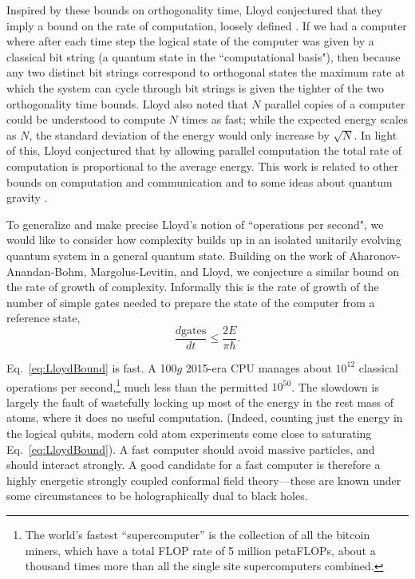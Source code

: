 \documentclass[12pt]{article}
\numberwithin{equation}{section}
\renewcommand{\eqref}[1]{Eq.~\ref{#1}}
\begin{document}
Inspired by these bounds on orthogonality time, Lloyd conjectured that they imply a bound on the rate of computation, loosely defined \cite{lloyd2000ultimate}. If we had a computer where after each time step the logical state of the computer was given by a classical bit string (a quantum state in the ``computational basis"), then because any two distinct bit strings correspond to orthogonal states the maximum rate at which the system can cycle through bit strings is given the tighter of the two orthogonality time bounds. Lloyd also noted that $N$ parallel copies of a computer could be understood to compute $N$ times as fast; while the expected energy scales as $N$, the standard deviation of the energy would only increase by $\sqrt{N}$. In light of this, Lloyd conjectured \cite{lloyd2000ultimate} that by allowing parallel computation the total rate of computation is proportional to the average energy. This work is related to other bounds on computation and communication \cite{otherbounds1,otherbounds2,otherbounds3} and to some ideas about quantum gravity \cite{lloyd_qg1,lloyd_qg2,lloyd_qg3}.

To generalize and make precise Lloyd's notion of ``operations per second", we would like to consider how complexity builds up in an isolated unitarily evolving quantum system in a general quantum state. Building on the work of Aharonov-Anandan-Bohm, Margolus-Levitin, and Lloyd, we conjecture a similar bound on the rate of growth of complexity. Informally this is the rate of growth of the number of simple gates needed to prepare the state of the computer from a reference state,
\begin{equation}
\frac{d \textrm{gates}}{dt} \leq \frac{2E}{\pi \hbar}. \label{eq:LloydBound}
\end{equation}


\eqref{eq:LloydBound} is fast. A 100$g$ 2015-era CPU manages about $10^{12}$ classical operations per second,\footnote{The world's fastest ``supercomputer'' is the collection of all the bitcoin miners, which have a total FLOP rate of 5 million petaFLOPs, about a thousand times more than all the single site supercomputers combined.} much less than the permitted $10^{50}$. The slowdown is largely the fault of wastefully locking up most of the energy in the rest mass of atoms, where it does no useful computation. (Indeed, counting just the energy in the logical qubits, modern cold atom experiments come close to saturating Eq.~\ref{eq:LloydBound}). A fast computer should avoid massive particles, and should interact strongly. A good candidate for a fast computer is therefore a highly energetic strongly coupled conformal field theory---these are known under some circumstances to be holographically dual to black holes.
\end{document}
